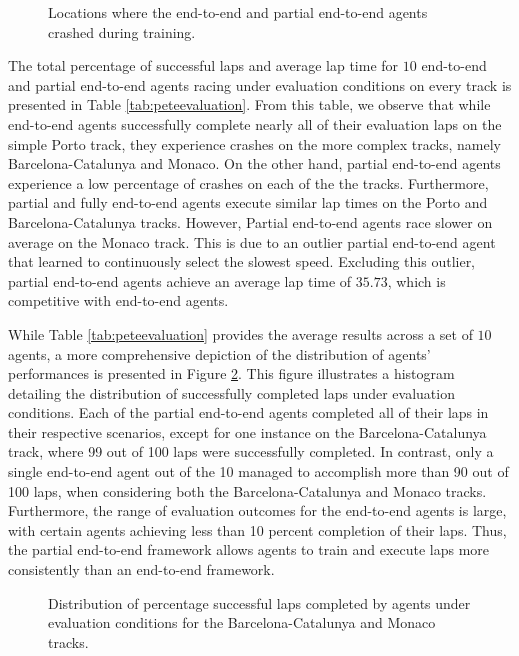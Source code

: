 \begin{figure}[htb!]
    \centering
    
    \caption{Locations where the end-to-end and partial end-to-end agents crashed during training.}
    \label{fig:esp_crashes}
\end{figure}


The total percentage of successful laps and average lap time for $10$ end-to-end and partial end-to-end agents racing under evaluation conditions on every track is presented in Table \ref{tab:peteevaluation}.
From this table, we observe that while end-to-end agents successfully complete nearly all of their evaluation laps on the simple Porto track, they experience crashes on the more complex tracks, namely Barcelona-Catalunya and Monaco.
On the other hand, partial end-to-end agents experience a low percentage of crashes on each of the the tracks.
Furthermore, partial and fully end-to-end agents execute similar lap times on the Porto and Barcelona-Catalunya tracks.
However, Partial end-to-end agents race slower on average on the Monaco track.
This is due to an outlier partial end-to-end agent that learned to continuously select the slowest speed.
Excluding this outlier, partial end-to-end agents achieve an average lap time of $35.73$, which is competitive with end-to-end agents. 



While Table \ref{tab:peteevaluation} provides the average results across a set of $10$ agents, 
a more comprehensive depiction of the distribution of agents' performances is presented in Figure \ref{fig:eval_dists}. 
This figure illustrates a histogram detailing the distribution of successfully completed laps under evaluation conditions.
Each of the partial end-to-end agents completed all of their laps in their respective scenarios, 
except for one instance on the Barcelona-Catalunya track, where 99 out of 100 laps were successfully completed. 
In contrast, only a single end-to-end agent out of the 10 managed to accomplish more than 90 out of 100 laps, when considering both the Barcelona-Catalunya and Monaco tracks.
Furthermore, the range of evaluation outcomes for the end-to-end agents is large, with certain agents achieving less than 10 percent completion of their laps. 
Thus, the partial end-to-end framework allows agents to train and execute laps more consistently than an end-to-end framework.


\begin{figure}[htb!]
    \centering
    
    \caption[Distribution of percentage successful laps completed by agents under evaluation conditions]{Distribution of percentage successful laps completed by agents under evaluation conditions for the Barcelona-Catalunya and Monaco tracks.}
    \label{fig:eval_dists}
\end{figure}


